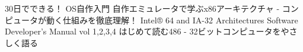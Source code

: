 \documentclass[10pt,a4j]{jsarticle}
\begin{document}
\begin{thebibliography}{99}
	 30日でできる！ OS自作入門
	 自作エミュレータで学ぶx86アーキテクチャ - コンピュータが動く仕組みを徹底理解！
	 Intel® 64 and IA-32 Architectures Software Developer’s Manual vol 1,2,3,4
	 はじめて読む486 - 32ビットコンピュータをやさしく語る
\end{thebibliography}
\end{document}
